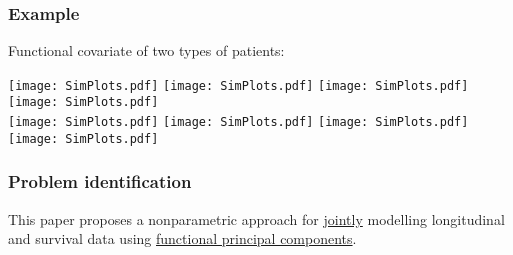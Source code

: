 \documentclass[10pt,dvipsnames,table]{beamer}
\begin{document}
\begin{frame}
\frametitle{Example}
Functional covariate of two types of patients:
\begin{center}
\texttt{[image: SimPlots.pdf]} 
\texttt{[image: SimPlots.pdf]} 
\texttt{[image: SimPlots.pdf]} 
\texttt{[image: SimPlots.pdf]} \\

\texttt{[image: SimPlots.pdf]} 
\texttt{[image: SimPlots.pdf]} 
\texttt{[image: SimPlots.pdf]} 
\texttt{[image: SimPlots.pdf]} 
\end{center}
\end{frame}

\begin{frame}
\frametitle{Problem identification}
This paper proposes a nonparametric approach for {\underline{jointly}} modelling longitudinal and survival data using {\underline{functional principal components}}.


\end{frame}
\end{document}

